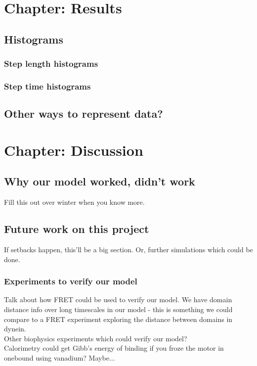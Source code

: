 \documentclass[10pt]{article} %
\begin{document}
\section{Chapter: Results}
	\subsection{Histograms}
		\subsubsection{Step length histograms}
		\subsubsection{Step time histograms}
	\subsection{Other ways to represent data?}


\section{Chapter: Discussion}
\subsection{Why our model worked, didn’t work}
Fill this out over winter when you know more.\\
\subsection{Future work on this project}
If setbacks happen, this'll be a big section. Or, further simulations which could be done.

\subsubsection{Experiments to verify our model}
Talk about how FRET could be used to verify our model. We have domain distance info over long
timescales in our model - this is something we could compare to a FRET experiment exploring
the distance between domains in dynein.\\

Other biophysics experiments which could verify our model?\\

Calorimetry could get Gibb's energy of binding if you froze the motor in onebound using
vanadium? Maybe...\\
\end{document}
